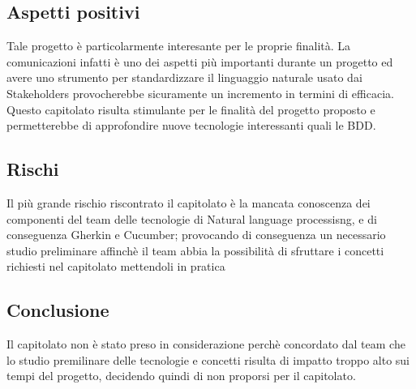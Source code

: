 \documentclass[../studio-di-fattibilita.tex]{subfiles}
\begin{document}
\subsection{Aspetti positivi}%
\label{aspetti_positivi}
Tale progetto è particolarmente interesante per le proprie finalità. La comunicazioni infatti è uno dei aspetti più importanti durante un progetto ed avere uno strumento per standardizzare il linguaggio naturale usato dai Stakeholders provocherebbe sicuramente un incremento in termini di efficacia. Questo capitolato risulta stimulante per le finalità del progetto proposto e permetterebbe di approfondire nuove tecnologie interessanti quali le BDD. 

\subsection{Rischi}%
\label{rischi}
Il più grande rischio riscontrato il capitolato è la mancata conoscenza dei componenti del team delle tecnologie di Natural language processisng,  e di conseguenza Gherkin e Cucumber; provocando di conseguenza un necessario studio preliminare affinchè il team abbia la possibilità di sfruttare i concetti richiesti nel capitolato mettendoli in pratica

\subsection{Conclusione}%
\label{sub:conclusione}
Il capitolato non è stato preso in considerazione perchè concordato dal team che lo studio premilinare delle tecnologie e concetti risulta di impatto troppo alto sui tempi del progetto, decidendo quindi di non proporsi per il capitolato.
\end{document}
